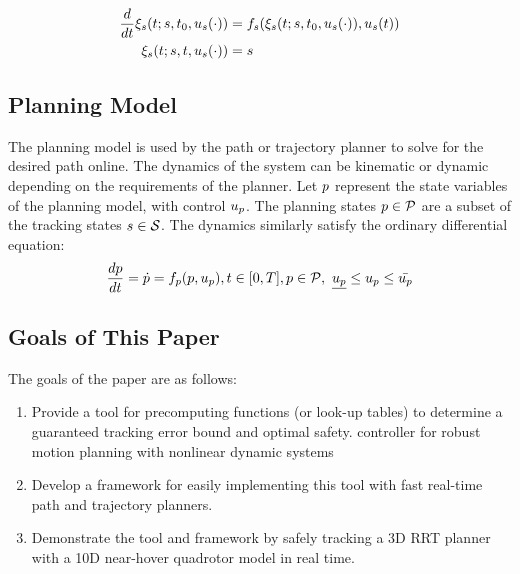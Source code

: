 \begin{equation}
\label{eq:fdyn_traj}
\begin{aligned}
\frac{d}{dt}\xi_{s}(t; s, t_0, u_s(\cdot)) &= f_s(\xi_{s}(t; s, t_0, u_s(\cdot)), u_s(t)) \\
\xi_{s}(t; s, t, u_s(\cdot)) &= s
\end{aligned}
\end{equation}

\subsection{Planning Model}
The planning model is used by the path or trajectory planner to solve for the desired path online. The dynamics of the system can be kinematic or dynamic depending on the requirements of the planner. Let $p$ represent the state variables of the planning model, with control $u_p$. The planning states $p \in \mathcal{P}$ are a subset of the tracking states $s \in \mathcal{S}$. The dynamics similarly satisfy the ordinary differential equation:
\begin{equation}
\begin{aligned}
\label{eq:pdyn}
\frac{dp}{dt} = \dot{p} = f_p(p, u_p), t \in [0, T], p \in \mathcal{P}, \ \underline{u_p} \leq u_p \leq \bar{u_p}
\end{aligned}
\end{equation}
\subsection{Goals of This Paper}
The goals of the paper are as follows:
\begin{enumerate}
	\item Provide a tool for precomputing functions (or look-up tables) to determine a guaranteed tracking error bound and optimal safety. controller for robust motion planning with nonlinear dynamic systems
	\item Develop a framework for easily implementing this tool with fast real-time path and trajectory planners.
	\item Demonstrate the tool and framework by safely tracking a 3D RRT planner with a 10D near-hover quadrotor model in real time.
\end{enumerate}
